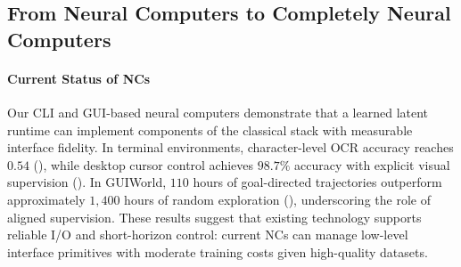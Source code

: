 \subsection{From Neural Computers to Completely Neural Computers}

\paragraph{Current Status of NCs}
Our CLI and GUI-based neural computers demonstrate that a learned latent runtime can implement components of the classical stack with measurable interface fidelity. In terminal environments, character-level OCR accuracy reaches $0.54$ (), while desktop cursor control achieves $98.7\%$ accuracy with explicit visual supervision (). In GUIWorld, $110$ hours of goal-directed trajectories outperform approximately $1{,}400$ hours of random exploration (), underscoring the role of aligned supervision. These results suggest that existing technology supports reliable I/O and short-horizon control: current NCs can manage low-level interface primitives with moderate training costs given high-quality datasets.

